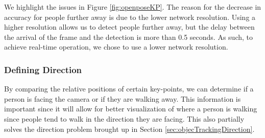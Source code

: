 We highlight the issues in Figure \ref{fig:openposeKP}. The reason for the decrease in accuracy for people further away is due to the lower network resolution. Using a higher resolution allows us to detect people further away, but the delay between the arrival of the frame and the detection is more than 0.5 seconds. As such, to achieve real-time operation, we chose to use a lower network resolution.

\subsubsection{Defining Direction} \label{sec:keypointEstimate}
By comparing the relative positions of certain key-points, we can determine if a person is facing the camera or if they are walking away. This information is important since it will allow for better visualization of where a person is walking since people tend to walk in the direction they are facing. This also partially solves the direction problem brought up in Section \ref{sec:objecTrackingDirection}.

